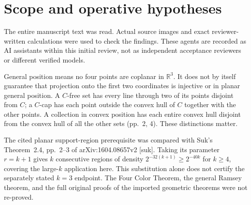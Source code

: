 \documentclass[10pt]{article}
\begin{document}
\section*{Scope and operative hypotheses}
The entire manuscript text was read. Actual source images and exact reviewer-written calculations were used to check the findings. These agents are recorded as AI assistants within this initial review, not as independent acceptance reviewers or different verified models.\par
General position means no four points are coplanar in \(\mathbb R^3\). It does not by itself guarantee that projection onto the first two coordinates is injective or in planar general position. A \(C\)-free set has every line through two of its points disjoint from \(C\); a \(C\)-cap has each point outside the convex hull of \(C\) together with the other points. A collection in convex position has each entire convex hull disjoint from the convex hull of all the other sets (pp. 2, 4). These distinctions matter.\par
The cited planar support-region prerequisite was compared with Suk’s Theorem 2.4, pp. 2–3 of arXiv:1604.08657v2 [suk]. Taking its parameter \(r=k+1\) gives \(k\) consecutive regions of density \(2^{-32(k+1)}\ge2^{-40k}\) for \(k\ge4\), covering the large-\(k\) application here. This substitution alone does not certify the separately stated \(k=3\) endpoint. The Four Color Theorem, the general Ramsey theorem, and the full original proofs of the imported geometric theorems were not re-proved.\par
\end{document}

